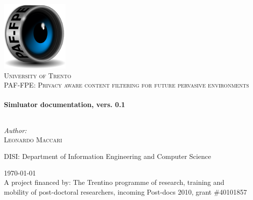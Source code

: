 \begin{titlepage}

\begin{center}


\includegraphics[width=0.25\textwidth]{logo-big}\\[1cm]
\textsc{\LARGE University of Trento}\\[1cm]
\textsc{\Large PAF-FPE: Privacy aware content filtering for future pervasive environments }\\[0.5cm]


\HRule \\[0.4cm]
{ \huge \bfseries Simluator documentation, vers. 0.1}\\[0.4cm]

\HRule \\[1.5cm]

\begin{minipage}{0.4\textwidth}
\begin{flushleft} \large
\emph{Author:}\\
\textsc{Leonardo Maccari}
\end{flushleft}
\end{minipage}
\begin{minipage}{0.4\textwidth}
\begin{flushright} \large
DISI: Department of Information Engineering and Computer Science 
\end{flushright}
\end{minipage}

\vfill

{\large \today}\\[0.5cm]
{A project financed by: The Trentino programme of research, training and mobility of post-doctoral researchers, incoming Post-docs 2010, grant \#40101857}
\end{center}

\end{titlepage}

